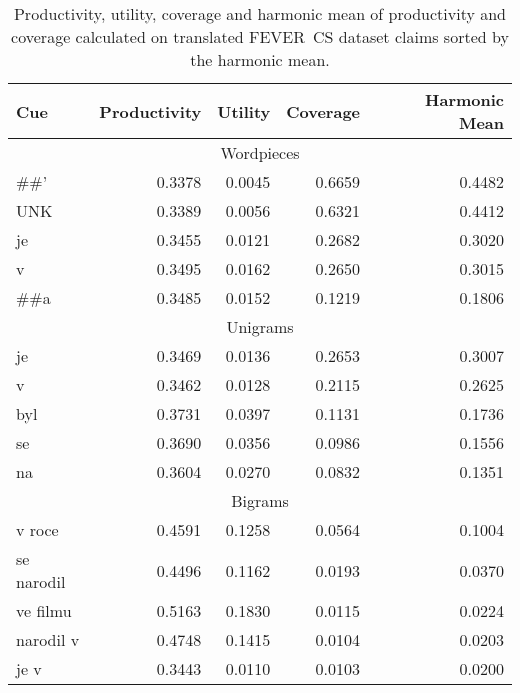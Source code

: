     \begin{table}[ht]
        \centering
        \begin{tabular}{lrrrr} 
            \toprule
            {Cue} &  Productivity &  Utility &  Coverage &  Harmonic Mean \\
            \midrule
            \multicolumn{5}{c}{Wordpieces} \\
            \#\#'  &        0.3378 &   0.0045 &    0.6659 &         0.4482 \\
            UNK &        0.3389 &   0.0056 &    0.6321 &         0.4412 \\
            je    &        0.3455 &   0.0121 &    0.2682 &         0.3020 \\
            v     &        0.3495 &   0.0162 &    0.2650 &         0.3015 \\
            \#\#a   &        0.3485 &   0.0152 &    0.1219 &         0.1806 \\
            \midrule
            \multicolumn{5}{c}{Unigrams} \\
            je    &        0.3469 &   0.0136 &    0.2653 &         0.3007 \\
            v     &        0.3462 &   0.0128 &    0.2115 &         0.2625 \\
            byl   &        0.3731 &   0.0397 &    0.1131 &         0.1736 \\
            se    &        0.3690 &   0.0356 &    0.0986 &         0.1556 \\
            na    &        0.3604 &   0.0270 &    0.0832 &         0.1351 \\
            \midrule
            \multicolumn{5}{c}{Bigrams} \\
            v roce              &        0.4591 &   0.1258 &    0.0564 &         0.1004 \\
            se narodil          &        0.4496 &   0.1162 &    0.0193 &         0.0370 \\
            ve filmu            &        0.5163 &   0.1830 &    0.0115 &         0.0224 \\
            narodil v           &        0.4748 &   0.1415 &    0.0104 &         0.0203 \\
            je v                &        0.3443 &   0.0110 &    0.0103 &         0.0200 \\
            \bottomrule
        \end{tabular}
        \caption[Productivity, utility, coverage and harmonic mean of productivity and coverage on FEVER~CS]{Productivity, utility, coverage and harmonic mean of productivity and coverage calculated on translated FEVER~CS dataset claims sorted by the harmonic mean.}
        \label{table:claim-quality-fever-prod-cov}
    \end{table}
    
